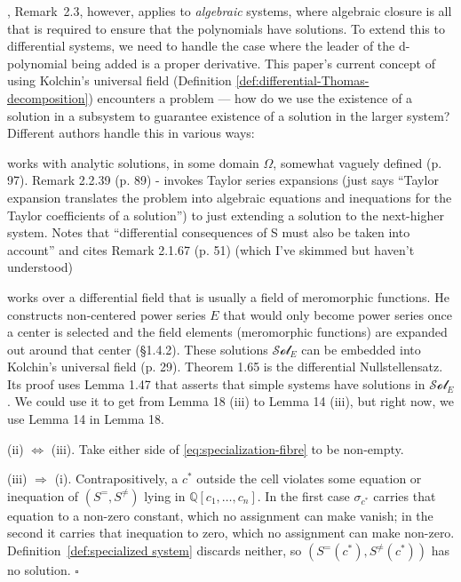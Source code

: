 \documentclass{article}
\theoremstyle{definition}
\theoremstyle{plain}
\newcommand{\qedbox}{\hspace*{\fill}\ensuremath{\square}}
\begin{document}
  \cite{ThomasDecomp}, Remark~2.3, however, applies to {\it algebraic} systems,
  where algebraic closure is all that is required to ensure that the polynomials have solutions.
  To extend this to differential systems, we need to handle the case where
  the leader of the d-polynomial being added is a proper derivative.
  This paper's current concept of using Kolchin's universal field (Definition \ref{def:differential-Thomas-decomposition})
  encounters a problem --- how do we use the existence of a solution in a subsystem
  to guarantee existence of a solution in the larger system?  Different authors handle this in various ways:

  \cite{RobertzLNM} works with analytic solutions, in some domain $\Omega$, somewhat vaguely defined (p. 97).
  Remark 2.2.39 (p. 89) - invokes Taylor series expansions (just says
  ``Taylor expansion translates the problem into algebraic equations and inequations
  for the Taylor coefficients of a solution'') to just extending a solution
  to the next-higher system.  Notes that ``differential consequences of S
  must also be taken into account'' and cites Remark 2.1.67 (p. 51)
  (which I've skimmed but haven't understood)

  \cite{LHthesis} works over a differential field that is usually a field of meromorphic functions.
  He constructs non-centered power series $E$ that would only become power series once a center is selected
  and the field elements (meromorphic functions) are expanded out around that center (\S 1.4.2).  These solutions $\mathcal{Sol}_E$
  can be embedded into Kolchin's universal field (p. 29).  Theorem 1.65 is the differential Nullstellensatz.
  Its proof uses Lemma 1.47 that asserts that simple systems have solutions in $\mathcal{Sol}_E$.
  We could use it to get from Lemma 18 (iii) to Lemma 14 (iii), but right now, we use Lemma 14 in Lemma 18.

  (ii) $\Leftrightarrow$ (iii).
  Take either side of \eqref{eq:specialization-fibre} to be non-empty.

  (iii) $\Rightarrow$ (i).  Contrapositively, a $c^*$ outside the cell violates
  some equation or inequation of $(S^=, S^{\ne})$ lying in
  $\mathbb{Q}[c_1, \ldots, c_n]$.  In the first case $\sigma_{c^*}$ carries that
  equation to a non-zero constant, which no assignment can make vanish; in the
  second it carries that inequation to zero, which no assignment can make
  non-zero.  Definition~\ref{def:specialized system} discards neither, so
  $(S^=(c^*), S^{\ne}(c^*))$ has no solution.
  \qedbox
\end{document}
